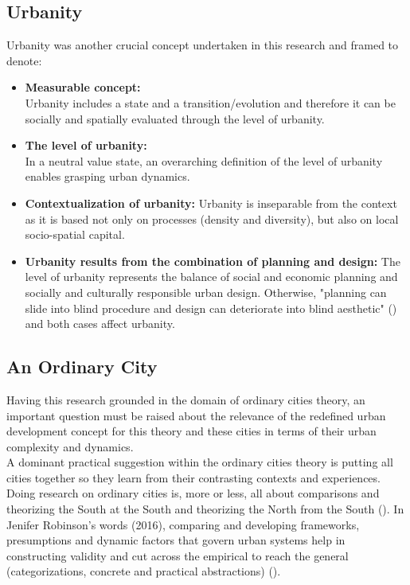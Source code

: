 \documentclass[11pt]{report}
\begin{document}
{{{\subsection{Urbanity}

Urbanity was another crucial concept undertaken in this research and framed to denote:

\begin{itemize}
\item \textbf{Measurable concept:}
\\
Urbanity includes a state and a transition/evolution and therefore it can be socially and spatially evaluated through the level of urbanity.

\item \textbf{The level of urbanity:}
\\
In a neutral value state, an overarching definition of the level of urbanity enables grasping urban dynamics.

\item \textbf{Contextualization of urbanity:}
Urbanity is inseparable from the context as it is based not only on processes (density and diversity), but also  on local socio-spatial capital.

\item \textbf{Urbanity results from the combination of planning and design:}
The level of urbanity represents the balance of social and economic planning and socially and culturally responsible urban design.
Otherwise, "planning can slide into blind procedure and design can deteriorate into blind aesthetic"
(\href{Van}{\citealt{van_assche_co-evolutions_2013}}) and both cases affect urbanity.
\end{itemize}

\subsection{An Ordinary City}

Having this research grounded in the domain of ordinary cities theory, an important question must be raised about the relevance of the redefined urban development concept for this theory and these cities in terms of their urban complexity and dynamics.
\\

A dominant practical suggestion within the ordinary cities theory is putting all cities together so they learn from their contrasting contexts and experiences. Doing research on ordinary cities is, more or less, all about comparisons and theorizing the South at the South   and theorizing the North from the South (\href{Chaplin}{\citealt{chaplin_architecture_2015}}).
In Jenifer Robinson's words (2016), comparing and developing frameworks, presumptions and dynamic factors that govern urban systems help in constructing validity and cut across the empirical to reach the general (categorizations, concrete and practical abstractions) (\href{Robinson}{\citealt{robinson_thinking_2016}}).
\\

}}}
\end{document}

